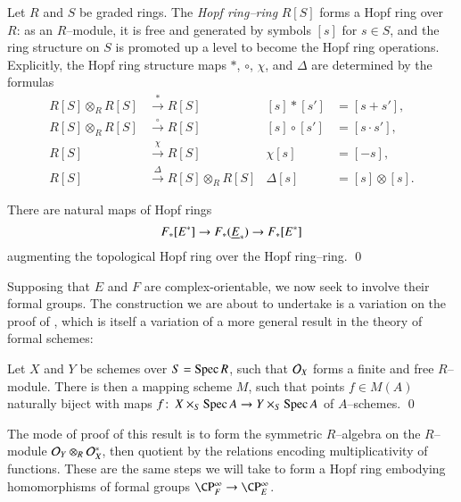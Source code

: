 \begin{definition}
Let $R$ and $S$ be graded rings.  The \textit{Hopf ring--ring} $R[S]$ forms a Hopf ring over $R$: as an $R$--module, it is free and generated by symbols $[s]$ for $s \in S$, and the ring structure on $S$ is promoted up a level to become the Hopf ring operations.  Explicitly, the Hopf ring structure maps $\ast$, $\circ$, $\chi$, and $\Delta$ are determined by the formulas
\begin{align*}
R[S] \otimes_R R[S] & \xrightarrow{\ast} R[S] & [s] \ast [s'] & = [s + s'], \\
R[S] \otimes_R R[S] & \xrightarrow{\circ} R[S] & [s] \circ [s'] & = [s \cdot s'], \\
R[S] & \xrightarrow{\chi} R[S] & \chi [s] & = [-s], \\
R[S] & \xrightarrow{\Delta} R[S] \otimes_R R[S] & \Delta [s] & = [s] \otimes [s].
\end{align*}
\end{definition}

\begin{lemma}
There are natural maps of Hopf rings \[F_*[E^*] \to F_*(\underline{\smash{E}}_{*}) \to F_*[E^*]\] augmenting the topological Hopf ring over the Hopf ring--ring. \qed
\end{lemma}

Supposing that $E$ and $F$ are complex-orientable, we now seek to involve their formal groups.  The construction we are about to undertake is a variation on the proof of , which is itself a variation of a more general result in the theory of formal schemes:
\begin{lemma}\label{MappingSchemeStatement}
Let $X$ and $Y$ be schemes over $S = \operatorname{Spec} R$, such that $\mathcal{O}_X$ forms a finite and free $R$--module.  There is then a mapping scheme $M$, such that points $f \in M(A)$ naturally biject with maps $f\colon\thinspace X \times_S \operatorname{Spec} A \to Y \times_S \operatorname{Spec} A$ of $A$--schemes. \qed
\end{lemma}

\noindent The mode of proof of this result is to form the symmetric $R$--algebra on the $R$--module $\mathcal{O}_Y \otimes_R \mathcal{O}_X^*$, then quotient by the relations encoding multiplicativity of functions.  These are the same steps we will take to form a Hopf ring embodying homomorphisms of formal groups $\CP^\infty_F \to \CP^\infty_E$.

